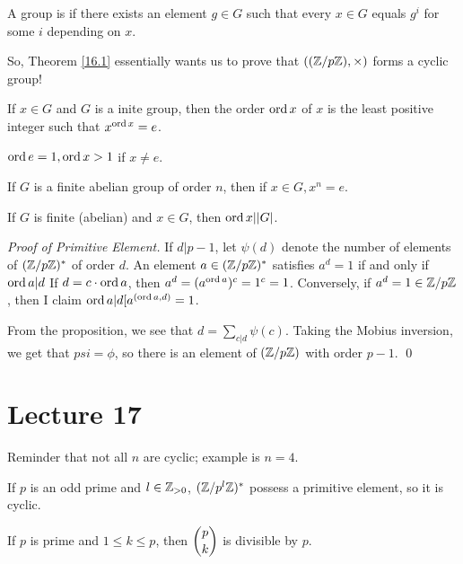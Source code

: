 \documentclass{article}
\begin{document}
\begin{definition} 
	A group is  if there exists an element $g \in G$ such that every $x \in G$ equals $g^i$ for some $i$ depending on $x$. 
\end{definition}

So, Theorem \ref{16.1} essentially wants us to prove that $((\mathbb Z / p\mathbb Z), \times)$ forms a cyclic group!

\begin{definition}[Order] 
	If $x \in G$ and $G$ is a inite group, then the order $\operatorname{ord} x$ of $x$ is the least positive integer such that $x^{\operatorname{ord} x} = e$.

	$\operatorname{ord} e = 1, \operatorname{ord} x > 1$ if $x \neq e$.
\end{definition}

\begin{lemma} 
	If $G$ is a finite abelian group of order $n$, then if $x \in G, x^n = e$.
\end{lemma}

\begin{corollary}
	If $G$ is finite (abelian) and $x \in G$, then $\operatorname{ord} x | |G|$.
\end{corollary}

\begin{proof}[Proof of Primitive Element]
	If $d | p-1$, let $\psi(d)$ denote the number of elements of $(\mathbb Z / p\mathbb Z)^*$ of order $d$. An element $a \in (\mathbb Z / p\mathbb Z)^*$ satisfies $a^d = 1$ if and only if $\operatorname{ord} a | d$ If $d = c \cdot \operatorname{ord} a$, then $a^d = (a^{\operatorname{ord} a})^c = 1^c = 1$. Conversely, if $a^d = 1 \in \mathbb Z/p\mathbb Z$, then I claim $\operatorname{ord} a | d [a^{(\operatorname{ord} a, d)} = 1$.

	From the proposition, we see that $d = \sum_{c | d} \psi(c)$. Taking the Mobius inversion, we get that $psi = \phi$, so there is an element of $(\mathbb Z / p\mathbb Z)$ with order $p-1$. \qed
\end{proof}

\section{Lecture 17}
Reminder that not all $n$ are cyclic; example is $n = 4$.

\begin{theorem}
	\label{17.1}
	If $p$ is an odd prime and $l \in \mathbb Z_{> 0}$, $(\mathbb Z / p^l \mathbb Z)^*$ possess a primitive element, so it is cyclic. 
\end{theorem} 

\begin{lemma}
	If $p$ is prime and $1 \leq k \leq p$, then $\dbinom{p}{k}$ is divisible by $p$.
\end{lemma} 
\end{document}
